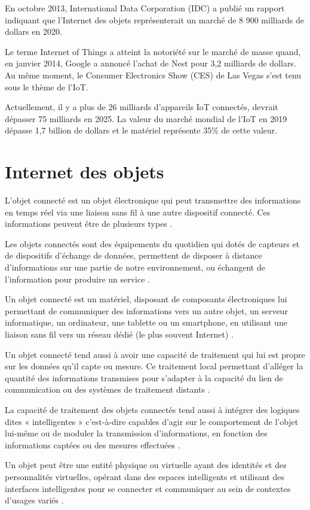 En octobre 2013, International Data Corporation (IDC) a publié un rapport indiquant que l'Internet des objets représenterait un marché de 8 900 milliards de dollars en 2020.


Le terme Internet of Things a atteint la notoriété sur le marché de masse quand, en janvier 2014, Google a annoncé l'achat de Nest pour 3,2 milliards de dollars. Au même moment, le Consumer Electronics Show (CES) de Las Vegas s'est tenu sous le thème de l'IoT.


Actuellement, il y a plus de 26 milliards d'appareils IoT connectés, devrait dépasser 75 milliards en 2025. La valeur du marché mondial de l'IoT en 2019 dépasse 1,7 billion de dollars et le matériel représente 35\% de cette valeur.
\section{Internet  des objets}
L'objet connecté est un objet électronique qui peut  transmettre des informations en temps réel via une liaison sans fil à une autre dispositif connecté. Ces informations peuvent être de plusieurs types \cite{1} .


Les objets connectés sont des équipements du quotidien qui dotés de capteurs et de dispositifs d’échange de données, permettent de disposer à distance d’informations sur une partie de notre environnement, ou échangent de l’information pour produire un service \cite{2,3}.


Un objet connecté est un matériel, disposant de composants électroniques lui permettant de communiquer des informations vers un autre objet, un serveur informatique, un ordinateur, une tablette ou un smartphone, en utilisant une liaison sans fil vers un réseau dédié (le plus souvent Internet) \cite{4}.


Un objet connecté tend aussi à avoir une capacité de traitement qui lui est propre sur les données qu’il capte ou mesure. Ce traitement local permettant d’alléger la quantité des informations transmises pour s’adapter à la capacité du lien de communication ou des systèmes de traitement distants \cite{5}. 


La capacité de traitement des objets connectés tend aussi à intégrer des logiques dites « intelligentes » c’est-à-dire capables d’agir sur le comportement \cite{6} de l’objet lui-même ou de moduler la transmission d’informations, en fonction des informations captées ou des mesures effectuées \cite{7}.


Un objet peut être  une entité physique ou virtuelle ayant des identités et des personnalités virtuelles, opérant dans des espaces intelligents et utilisant des interfaces intelligentes pour se connecter et communiquer au sein de contextes d’usages variés \cite{8}.

